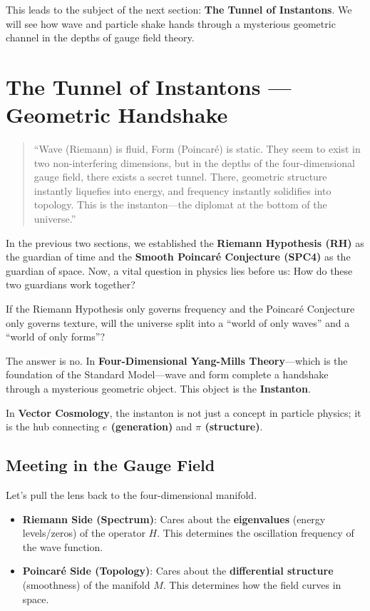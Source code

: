 \documentclass[11pt,a4paper,twoside]{book}
\begin{document}
This leads to the subject of the next section: \textbf{The Tunnel of Instantons}. We will see how wave and particle shake hands through a mysterious geometric channel in the depths of gauge field theory.

\section{The Tunnel of Instantons — Geometric Handshake}

\begin{quote}
``Wave (Riemann) is fluid, Form (Poincaré) is static. They seem to exist in two non-interfering dimensions, but in the depths of the four-dimensional gauge field, there exists a secret tunnel. There, geometric structure instantly liquefies into energy, and frequency instantly solidifies into topology. This is the instanton—the diplomat at the bottom of the universe.''
\end{quote}

In the previous two sections, we established the \textbf{Riemann Hypothesis (RH)} as the guardian of time and the \textbf{Smooth Poincaré Conjecture (SPC4)} as the guardian of space. Now, a vital question in physics lies before us: How do these two guardians work together?

If the Riemann Hypothesis only governs frequency and the Poincaré Conjecture only governs texture, will the universe split into a ``world of only waves'' and a ``world of only forms''?

The answer is no. In \textbf{Four-Dimensional Yang-Mills Theory}—which is the foundation of the Standard Model—wave and form complete a handshake through a mysterious geometric object. This object is the \textbf{Instanton}.

In \textbf{Vector Cosmology}, the instanton is not just a concept in particle physics; it is the hub connecting \textbf{$e$ (generation)} and \textbf{$\pi$ (structure)}.

\subsection{Meeting in the Gauge Field}

Let's pull the lens back to the four-dimensional manifold.

\begin{itemize}
\item \textbf{Riemann Side (Spectrum)}: Cares about the \textbf{eigenvalues} (energy levels/zeros) of the operator $H$. This determines the oscillation frequency of the wave function.

\item \textbf{Poincaré Side (Topology)}: Cares about the \textbf{differential structure} (smoothness) of the manifold $M$. This determines how the field curves in space.
\end{itemize}
\end{document}
